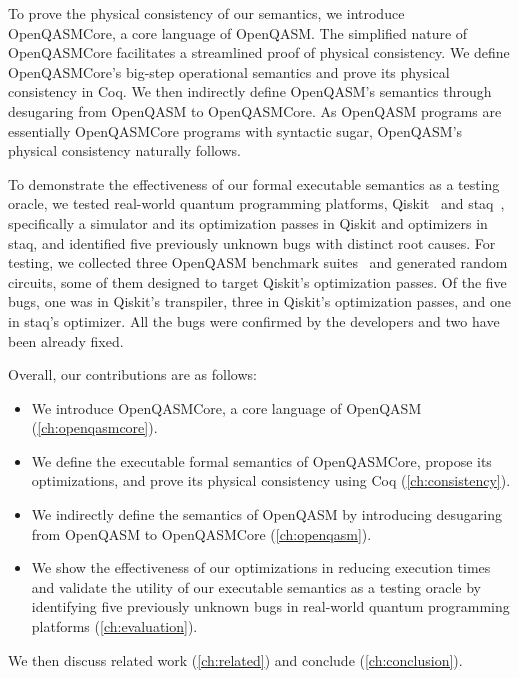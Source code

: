 To prove the physical consistency of our semantics, we introduce OpenQASMCore,
a core language of OpenQASM.
%
The simplified nature of OpenQASMCore facilitates a streamlined proof of
physical consistency.
%
We define OpenQASMCore's big-step operational semantics and prove its physical
consistency in Coq.
%
We then indirectly define OpenQASM's semantics through desugaring from OpenQASM
to OpenQASMCore.
%
As OpenQASM programs are essentially OpenQASMCore programs with syntactic
sugar, OpenQASM's physical consistency naturally follows.

To demonstrate the effectiveness of our formal executable semantics as a
testing oracle, we tested real-world quantum programming platforms,
Qiskit~\cite{qiskit} and staq~\cite{staq}, specifically a simulator and its
optimization passes in Qiskit and optimizers in staq, and identified five
previously unknown bugs with distinct root causes.
%
For testing, we collected three OpenQASM benchmark suites~\cite{cross2017open,
	li2023qasmbench, tomesh2022supermarq} and generated random circuits, some of
them designed to target Qiskit's optimization passes.
%
Of the five bugs, one was in Qiskit's transpiler, three in Qiskit's
optimization passes, and one in staq's optimizer.
%
All the bugs were confirmed by the developers and two have been already fixed.

Overall, our contributions are as follows:
%
\begin{itemize}
	\item We introduce OpenQASMCore, a core language of OpenQASM
	      (\cref{ch:openqasmcore}).
	\item We define the executable formal semantics of OpenQASMCore, propose its
	      optimizations, and prove its physical consistency using Coq
	      (\cref{ch:consistency}).
	\item We indirectly define the semantics of OpenQASM by introducing desugaring from
	      OpenQASM to OpenQASMCore (\cref{ch:openqasm}).
	\item We show the effectiveness of our optimizations in reducing execution times and
	      validate the utility of our executable semantics as a testing oracle by
	      identifying five previously unknown bugs in real-world quantum programming
	      platforms (\cref{ch:evaluation}).
\end{itemize}
%
We then discuss related work (\cref{ch:related}) and conclude
(\cref{ch:conclusion}).